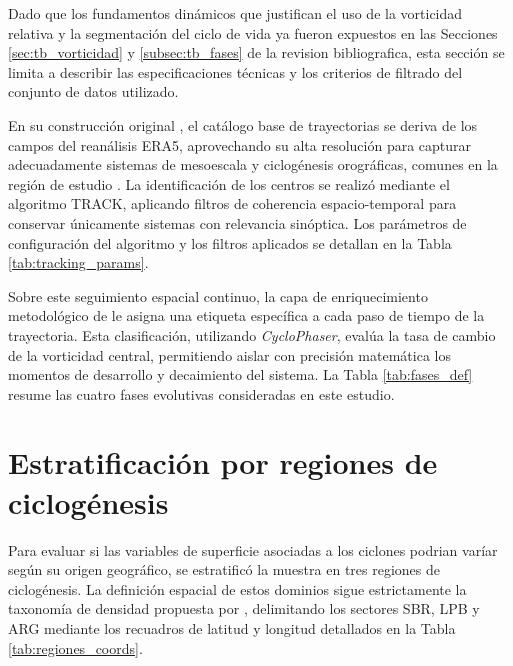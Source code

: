 Dado que los fundamentos dinámicos que justifican el uso de la vorticidad relativa y la segmentación del ciclo de vida ya fueron expuestos en las Secciones \ref{sec:tb_vorticidad} y \ref{subsec:tb_fases} de la revision bibliografica, esta sección se limita a describir las especificaciones técnicas y los criterios de filtrado del conjunto de datos utilizado.

En su construcción original \citep{gramcianinov2019properties}, el catálogo base de trayectorias se deriva de los campos del reanálisis ERA5, aprovechando su alta resolución para capturar adecuadamente sistemas de mesoescala y ciclogénesis orográficas, comunes en la región de estudio \citep{gramcianinov2020analysis}. La identificación de los centros se realizó mediante el algoritmo TRACK, aplicando filtros de coherencia espacio-temporal para conservar únicamente sistemas con relevancia sinóptica. Los parámetros de configuración del algoritmo y los filtros aplicados se detallan en la Tabla \ref{tab:tracking_params}.



Sobre este seguimiento espacial continuo, la capa de enriquecimiento metodológico de \citet{coutodesouza2024new} le asigna una etiqueta específica a cada paso de tiempo de la trayectoria. Esta clasificación, utilizando \textit{CycloPhaser}, evalúa la tasa de cambio de la vorticidad central, permitiendo aislar con precisión matemática los momentos de desarrollo y decaimiento del sistema. La Tabla \ref{tab:fases_def} resume las cuatro fases evolutivas consideradas en este estudio.



\section{Estratificación por regiones de ciclogénesis}\label{sec:regiones_ciclogenesis}

Para evaluar si las variables de superficie asociadas a los ciclones podrian varíar según su origen geográfico, se estratificó la muestra en tres regiones de ciclogénesis. La definición espacial de estos dominios sigue estrictamente la taxonomía de densidad propuesta por \citet{gramcianinov2019properties}, delimitando los sectores SBR, LPB y ARG mediante los recuadros de latitud y longitud detallados en la Tabla \ref{tab:regiones_coords}.



